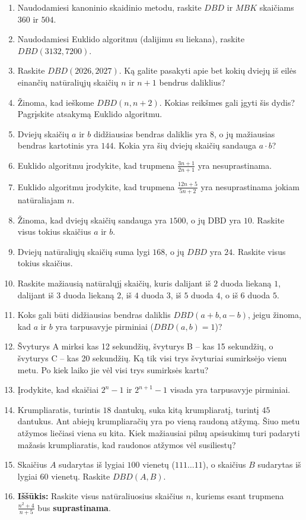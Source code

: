 \documentclass[11pt,a4paper]{scrartcl}
\begin{document}
\begin{enumerate}
    \renewcommand{\labelenumi}{\textbf{\theenumi.}}
    \item Naudodamiesi kanoninio skaidinio metodu, raskite $DBD$ ir $MBK$ skaičiams $360$ ir $504$.
    \item Naudodamiesi Euklido algoritmu (dalijimu su liekana), raskite $DBD(3132, 7200)$.
    \item Raskite $DBD(2026, 2027)$. Ką galite pasakyti apie bet kokių dviejų iš eilės einančių natūraliųjų skaičių $n$ ir $n+1$ bendrus daliklius?
    \item Žinoma, kad ieškome $DBD(n, n+2)$. Kokias reikšmes gali įgyti šis dydis? Pagrįskite atsakymą Euklido algoritmu.
    \item Dviejų skaičių $a$ ir $b$ didžiausias bendras daliklis yra $8$, o jų mažiausias bendras kartotinis yra $144$. Kokia yra šių dviejų skaičių sandauga $a \cdot b$?
    \item Euklido algoritmu įrodykite, kad trupmena $\frac{3n+1}{2n+1}$ yra nesuprastinama.
    \item Euklido algoritmu įrodykite, kad trupmena $\frac{12n+5}{5n+2}$ yra nesuprastinama jokiam natūraliajam $n$.
    \item Žinoma, kad dviejų skaičių sandauga yra $1500$, o jų DBD yra $10$. Raskite visus tokius skaičius $a$ ir $b$.
    \item Dviejų natūraliųjų skaičių suma lygi $168$, o jų $DBD$ yra $24$. Raskite visus tokius skaičius.
    \item Raskite mažiausią natūralųjį skaičių, kuris dalijant iš $2$ duoda liekaną $1$, dalijant iš $3$ duoda liekaną $2$, iš $4$ duoda $3$, iš $5$ duoda $4$, o iš $6$ duoda $5$.
    \item Koks gali būti didžiausias bendras daliklis $DBD(a+b, a-b)$, jeigu žinoma, kad $a$ ir $b$ yra tarpusavyje pirminiai ($DBD(a, b) = 1$)?
    \item Švyturys A mirksi kas 12 sekundžių, švyturys B – kas 15 sekundžių, o švyturys C – kas 20 sekundžių. Ką tik visi trys švyturiai sumirksėjo vienu metu. Po kiek laiko jie vėl visi trys sumirksės kartu?
    \item Įrodykite, kad skaičiai $2^n - 1$ ir $2^{n+1} - 1$ visada yra tarpusavyje pirminiai.
    \item Krumpliaratis, turintis $18$ dantukų, suka kitą krumpliaratį, turintį $45$ dantukus. Ant abiejų krumpliaračių yra po vieną raudoną atžymą. Šiuo metu atžymos liečiasi viena su kita. Kiek mažiausiai pilnų apsisukimų turi padaryti mažasis krumpliaratis, kad raudonos atžymos vėl susiliestų?
    \item Skaičius $A$ sudarytas iš lygiai $100$ vienetų ($111\dots11$), o skaičius $B$ sudarytas iš lygiai $60$ vienetų. Raskite $DBD(A, B)$.
    \item \textbf{Iššūkis:} Raskite visus natūraliuosius skaičius $n$, kuriems esant trupmena $\frac{n^2 + 4}{n + 5}$ bus \textbf{suprastinama}.
\end{enumerate}
\end{document}
